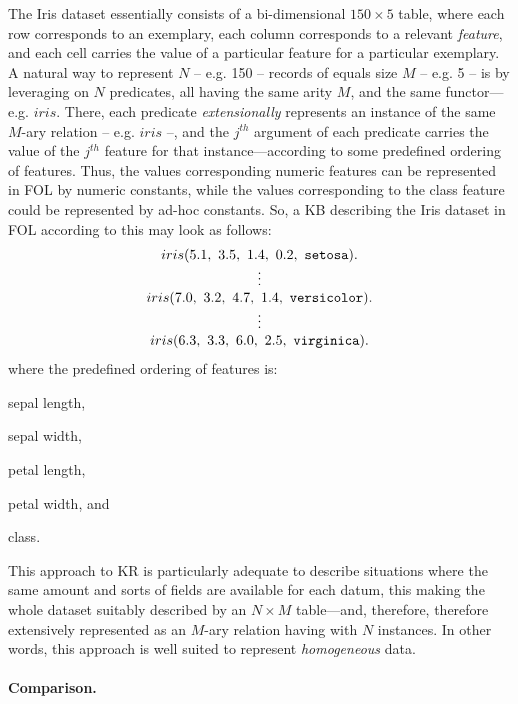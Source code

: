\documentclass[12pt,a4paper,openright,twoside]{book}
\begin{document}
The Iris dataset essentially consists of a bi-dimensional $150 \times 5$ table, where each row corresponds to an exemplary, each column corresponds to a relevant \emph{feature}, and each cell carries the value of a particular feature for a particular exemplary.
%
A natural way to represent $N$ -- e.g. 150 -- records of equals size $M$ -- e.g. 5 -- is by leveraging on $N$ predicates, all having the same arity $M$, and the same functor---e.g. $iris$.
%
There, each predicate \emph{extensionally} represents an instance of the same $M$-ary relation -- e.g. $iris$ --, and the $j^{th}$ argument of each predicate carries the value of the $j^{th}$ feature for that instance---according to some predefined ordering of features.
%
Thus, the values corresponding numeric features can be represented in FOL by numeric constants, while the values corresponding to the class feature could be represented by ad-hoc constants.
%
So, a KB describing the Iris dataset in FOL according to this may look as follows:
%
\begin{equation}
    \begin{array}{c}
        iris(5.1,\ 3.5,\ 1.4,\ 0.2,\ \mathtt{setosa}).
        \\\vdots\\
        iris(7.0,\ 3.2,\ 4.7,\ 1.4,\ \mathtt{versicolor}).
        \\\vdots\\
        iris(6.3,\ 3.3,\ 6.0,\ 2.5,\ \mathtt{virginica}).
    \end{array}
\end{equation} 
%
where the predefined ordering of features is: 
%
\begin{inlinelist}
    \item sepal length,
    \item sepal width,
    \item petal length,
    \item petal width, and
    \item class.
\end{inlinelist}

This approach to KR is particularly adequate to describe situations where the same amount and sorts of fields are available for each datum, this making the whole dataset suitably described by an $N \times M$ table---and, therefore, therefore extensively represented as an $M$-ary relation having with $N$ instances.
%
In other words, this approach is well suited to represent \emph{homogeneous} data.

\paragraph{Comparison.}
\end{document}
